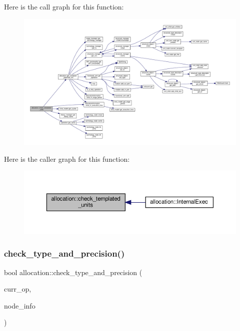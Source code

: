 Here is the call graph for this function\+:
\nopagebreak
\begin{figure}[H]
\begin{center}
\leavevmode
\includegraphics[width=350pt]{d0/d74/classallocation_a5aa6886382ebdc049a6bc4ef82225973_cgraph}
\end{center}
\end{figure}
Here is the caller graph for this function\+:
\nopagebreak
\begin{figure}[H]
\begin{center}
\leavevmode
\includegraphics[width=350pt]{d0/d74/classallocation_a5aa6886382ebdc049a6bc4ef82225973_icgraph}
\end{center}
\end{figure}
\mbox{\label{classallocation_a92dce6f1c4e5c6c794ef18ed545fc21d}} 
\subsubsection{\texorpdfstring{check\+\_\+type\+\_\+and\+\_\+precision()}{check\_type\_and\_precision()}}
{\footnotesize\ttfamily bool allocation\+::check\+\_\+type\+\_\+and\+\_\+precision (\begin{DoxyParamCaption}\item[{\hyperlink{structoperation}{operation} $\ast$}]{curr\+\_\+op,  }\item[{node\+\_\+kind\+\_\+prec\+\_\+info\+Ref}]{node\+\_\+info }\end{DoxyParamCaption})\hspace{0.3cm}{\ttfamily [protected]}}



